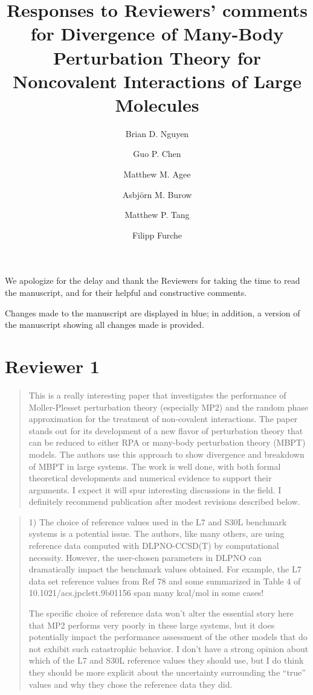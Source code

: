 \documentclass[journal=jctcce,manuscript=article]{achemso}
\author{Brian D. Nguyen}
\author{Guo P. Chen}
\author{Matthew M. Agee}
\author{Asbj{\"o}rn M. Burow}
\author{Matthew P. Tang}
\author{Filipp Furche}
\affiliation{Department of Chemistry, University of California, Irvine,
    1102 Natural Sciences II, Irvine, CA 92697-2025, USA}
\title[Review]{Responses to Reviewers' comments for
  Divergence of Many-Body Perturbation Theory for Noncovalent
  Interactions of Large Molecules}
\newcommand{\filipp}[1]{{\color{red} #1}}
\newenvironment{reviewer}%
{\begin{quote}%
  \begin{changebar}\cbcolor{gray}\color{black}}%
  {\end{changebar}%
\end{quote}}
\begin{document}


\clearpage


We apologize for the delay and thank the Reviewers for taking the time
to read the manuscript, and for their helpful and constructive comments. 

Changes made to the manuscript are displayed in blue; in addition, a
version of the manuscript showing all changes made is provided. 

\section*{Reviewer 1}

\begin{reviewer}
  This is a really interesting paper that investigates the performance of
  Moller-Plesset perturbation theory (especially MP2) and the random phase
  approximation for the treatment of non-covalent interactions. The paper
  stands out for its development of a new flavor of perturbation theory
  that can be reduced to either RPA or many-body perturbation theory (MBPT)
  models. The authors use this approach to show divergence and breakdown
  of MBPT in large systems.  The work is well done, with both formal
  theoretical developments and numerical evidence to support their arguments.
  I expect it will spur interesting discussions in the field. I definitely
  recommend publication after modest revisions described below.
\end{reviewer}
  
\begin{reviewer}
  1) The choice of reference values used in the L7 and S30L benchmark systems
  is a potential issue.  The authors, like many others, are using reference
  data computed with DLPNO-CCSD(T) by computational necessity.  However, the
  user-chosen parameters in DLPNO can dramatically impact the benchmark values
  obtained. For example, the L7 data set reference values from Ref 78 and
  some summarized in Table 4 of 10.1021/acs.jpclett.9b01156 span many kcal/mol
  in some cases!
  
  The specific choice of reference data won't alter the essential story here
  that MP2 performs very poorly in these large systems, but it does potentially
  impact the performance assessment of the other models that do not exhibit such
  catastrophic behavior.  I don't have a strong opinion about which of the L7
  and S30L reference values they should use, but I do think they should be more
  explicit about the uncertainty surrounding the ``true'' values and why they
  chose the reference data they did.
\end{reviewer}
\end{document}
